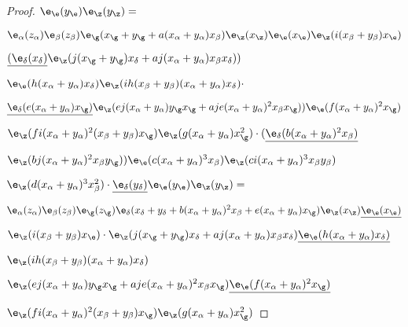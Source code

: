 \documentclass{memo-l}
\theoremstyle{definition}
\theoremstyle{remark}
\numberwithin{section}{chapter}
\numberwithin{equation}{chapter}
\begin{document}
\begin{proof}
${\e}_{{\e}}(y_{{\e}}){\e}_{{\z}}(y_{{\z}}) = $

\medpagebreak

$\e_\alpha(z_\alpha)\e_\beta(z_\beta)
{\e}_{{\g}}({ x_{{\g}}+y_{{\g}}+a(x_{\alpha}+
y_{\alpha})x_{\beta}}){\e}_{{\z}}(x_{{\z}})
{\e}_{{\e}}(x_{{\e}}){\e}_{{\z}}(i(x_{\beta}+
y_{\beta})x_{{\e}})$

${\underline{({\e}_{{\delta}}
(x_{\delta})}}{\e}_{{\z}}(j(x_{{\g}}+y_{{\g}})x_{{\delta}}+aj(x_{\alpha}+
y_{\alpha})x_{\beta}x_{{\delta}}){ )}$

${\e}_{{\e}}
(h(x_{\alpha}+y_{\alpha})x_{{\delta}}){\e}_{{\z}}(ih(x_{\beta}+
y_{\beta})(x_{\alpha}+y_{\alpha})x_{\delta})\cdot$ 

${\underline{{\e}_{{\delta}}(e(x_{\alpha}+y_{\alpha})x_{{\g}})}} 
{\e}_{{\z}}(ej(x_{\alpha}+y_{\alpha})y_{{\g}}x_{{\g}}+
aje(x_{\alpha}+y_{\alpha})^{2}x_{\beta}x_{{\g}}){ )}
{\e}_{{\e}}(f(x_{\alpha}+y_{\alpha})^{2}x_{{\g}})$

${\e}_{{\z}}(fi(x_{\alpha}+y_{\alpha})^{2}(x_{\beta}+
y_{\beta})x_{{\g}}){\e}_{{\z}}(g(x_{\alpha}+y_{\alpha})
x_{{\g}}^{2})\cdot ({\underline{{\e}_{{\delta}}(b(x_{\alpha}
+y_{\alpha}) ^{2} x_{\beta})}}$ 


${\e}_{{\z}}(bj(x_{\alpha}+y_{\alpha})^{2}x_{\beta}y_{{\g}})
{ )}{\e}_{{\e}}(c(x_{\alpha}+y_{\alpha})^{3}x_{\beta})
{\e}_{{\z}}(ci(x_{\alpha}+y_{\alpha})^{3}x_{\beta}y_{\beta})$


${\e}_{{\z}}(d(x_{\alpha}+y_{\alpha})^{3}x_{\beta}^{2}) \cdot
{\underline{{\e}_{{\delta}}(y_{{\delta}})}} {\e}_{{\e}}
(y_{{\e}}){\e}_{{\z}}(y_{{\z}}) =$

\medpagebreak


$\e_\alpha(z_{\alpha})\e_\beta(z_\beta)
\e_\g(z_\g)\e_\delta( x_\delta+y_\delta+b(x_\alpha+y_\alpha)^2x_\beta+e(x_\alpha+
y_\alpha)x_\g)\e_\z(x_\z)
{\underline{\e_\e(x_\e)}}$



${\e}_{{\z}}(i(x_{\beta}+y_{\beta})x_{{\e}})\cdot
{\e}_{{\z}}(j(x_{{\g}}+y_{{\g}})x_{{\delta}}+
aj(x_{\alpha}+y_{\alpha})x_{\beta}x_{{\delta}}) 
{\underline{{\e}_{{\e}}(h(x_{\alpha}+
y_{\alpha})x_{{\delta}})}}$ 

${\e}_{{\z}}(ih(x_{\beta}+y_{\beta})(x_{\alpha}+y_{\alpha})
x_{{\delta}})$

${\e}_{{\z}}(ej(x_{\alpha}+y_{\alpha})
y_{{\g}}x_{{\g}}+aje(x_{\alpha}+y_{\alpha})^{2}x_{\beta}
x_\g){\underline{\e_{{\e}}(f(x_{\alpha}+
y_\alpha)^2 x_\g)}}$ 

${\e}_{{\z}}(fi(x_{\alpha}+y_{\alpha})^{2}(x_{\beta}+
y_{\beta})x_{{\g}}){\e}_{{\z}}(g(x_{\alpha}+y_{\alpha})
x_{{\g}}^{2})$


\end{proof}
\end{document}
